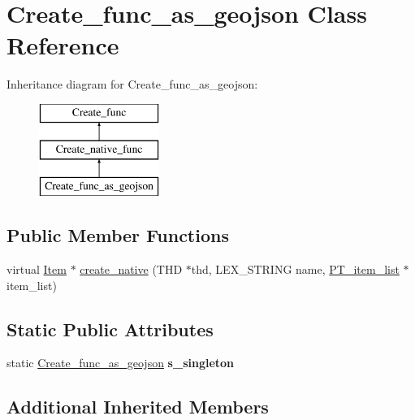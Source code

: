 \hypertarget{classCreate__func__as__geojson}{}\section{Create\+\_\+func\+\_\+as\+\_\+geojson Class Reference}
\label{classCreate__func__as__geojson}
Inheritance diagram for Create\+\_\+func\+\_\+as\+\_\+geojson\+:\begin{figure}[H]
\begin{center}
\leavevmode
\includegraphics[height=3.000000cm]{classCreate__func__as__geojson}
\end{center}
\end{figure}
\subsection*{Public Member Functions}
\begin{DoxyCompactItemize}
\item 
virtual \mbox{\hyperlink{classItem}{Item}} $\ast$ \mbox{\hyperlink{classCreate__func__as__geojson_a8baba217f761c737954b6639f21ee4b8}{create\+\_\+native}} (T\+HD $\ast$thd, L\+E\+X\+\_\+\+S\+T\+R\+I\+NG name, \mbox{\hyperlink{classPT__item__list}{P\+T\+\_\+item\+\_\+list}} $\ast$item\+\_\+list)
\end{DoxyCompactItemize}
\subsection*{Static Public Attributes}
\begin{DoxyCompactItemize}
\item 
\mbox{\label{classCreate__func__as__geojson_a8e03ff79eccf6862a7544e9a373d4777}} 
static \mbox{\hyperlink{classCreate__func__as__geojson}{Create\+\_\+func\+\_\+as\+\_\+geojson}} {\bfseries s\+\_\+singleton}
\end{DoxyCompactItemize}
\subsection*{Additional Inherited Members}


